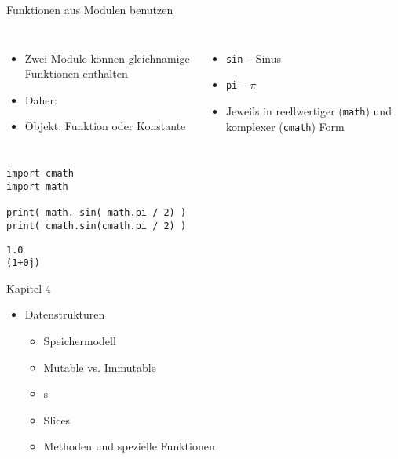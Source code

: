 
\begin{frame}[fragile]{Funktionen aus Modulen benutzen}
%
\begin{columns}
\begin{itemize}
\item Zwei Module können gleichnamige Funktionen enthalten
\item Daher: 
\item Objekt: Funktion oder Konstante
\end{itemize}
%
\begin{itemize}
\item \texttt{sin} -- Sinus
\item \texttt{pi} -- $\pi$
\item Jeweils in reellwertiger (\texttt{math}) und komplexer (\texttt{cmath}) Form 
\end{itemize}
\end{columns}
%
\begin{tcbraster}[raster columns=2,
                  raster equal height,
                  nobeforeafter,
                  raster column skip=0.5cm]
\begin{codebox}
\begin{verbatim}
import cmath
import math

print( math. sin( math.pi / 2) )
print( cmath.sin(cmath.pi / 2) )
\end{verbatim}
\end{codebox}
%
\begin{cmdbox}[Ausgabe]
\begin{verbatim}
1.0
(1+0j)
\end{verbatim}
\end{cmdbox}
\end{tcbraster}
%
\end{frame}


\begin{frame}{Kapitel 4}
%
\begin{itemize}
\item Datenstrukturen
	\begin{itemize}
	\item Speichermodell
	\item Mutable vs. Immutable
	\item {}s
	\item Slices
	\item Methoden und spezielle Funktionen
	\end{itemize}
\end{itemize}
%
\end{frame}

